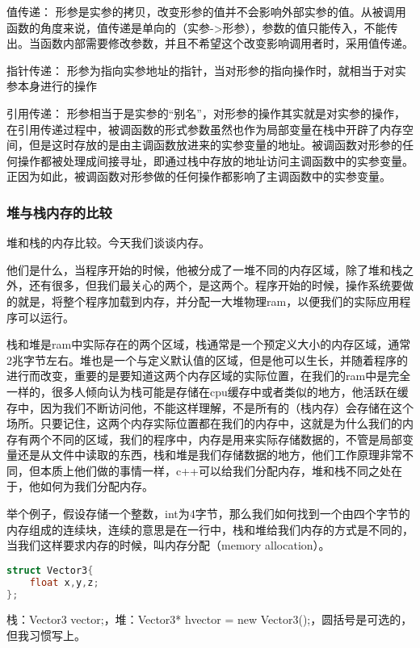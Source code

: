 值传递：
形参是实参的拷贝，改变形参的值并不会影响外部实参的值。从被调用函数的角度来说，值传递是单向的（实参->形参），参数的值只能传入，不能传出。当函数内部需要修改参数，并且不希望这个改变影响调用者时，采用值传递。

指针传递：
形参为指向实参地址的指针，当对形参的指向操作时，就相当于对实参本身进行的操作

引用传递：
形参相当于是实参的“别名”，对形参的操作其实就是对实参的操作，在引用传递过程中，被调函数的形式参数虽然也作为局部变量在栈中开辟了内存空间，但是这时存放的是由主调函数放进来的实参变量的地址。被调函数对形参的任何操作都被处理成间接寻址，即通过栈中存放的地址访问主调函数中的实参变量。正因为如此，被调函数对形参做的任何操作都影响了主调函数中的实参变量。

\subsubsection{堆与栈内存的比较}

堆和栈的内存比较。今天我们谈谈内存。

他们是什么，当程序开始的时候，他被分成了一堆不同的内存区域，除了堆和栈之外，还有很多，但我们最关心的两个，是这两个。程序开始的时候，操作系统要做的就是，将整个程序加载到内存，并分配一大堆物理ram，以便我们的实际应用程序可以运行。

栈和堆是ram中实际存在的两个区域，栈通常是一个预定义大小的内存区域，通常2兆字节左右。堆也是一个与定义默认值的区域，但是他可以生长，并随着程序的进行而改变，重要的是要知道这两个内存区域的实际位置，在我们的ram中是完全一样的，很多人倾向认为栈可能是存储在cpu缓存中或者类似的地方，他活跃在缓存中，因为我们不断访问他，不能这样理解，不是所有的（栈内存）会存储在这个场所。只要记住，这两个内存实际位置都在我们的内存中，这就是为什么我们的内存有两个不同的区域，我们的程序中，内存是用来实际存储数据的，不管是局部变量还是从文件中读取的东西，栈和堆是我们存储数据的地方，他们工作原理非常不同，但本质上他们做的事情一样，c++可以给我们分配内存，堆和栈不同之处在于，他如何为我们分配内存。

举个例子，假设存储一个整数，int为4字节，那么我们如何找到一个由四个字节的内存组成的连续块，连续的意思是在一行中，栈和堆给我们内存的方式是不同的，当我们这样要求内存的时候，叫内存分配（memory allocation）。


\begin{lstlisting}[language=c++]
struct Vector3{
    float x,y,z;
};
\end{lstlisting}

栈：{\ncodestyle Vector3 vector;}，堆：{\ncodestyle Vector3* hvector = new Vector3();}，圆括号是可选的，但我习惯写上。

